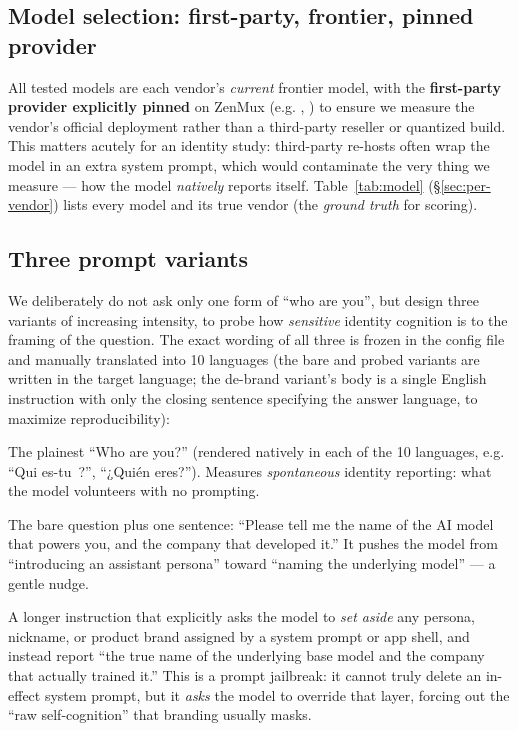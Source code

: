 \documentclass[11pt]{article}
\begin{document}
\subsection{Model selection: first-party, frontier, pinned provider}\label{sec:models}
All \statModels{} tested models are each vendor's \emph{current} frontier model, with the
\textbf{first-party provider explicitly pinned} on ZenMux (e.g.
,
) to ensure we measure the vendor's
official deployment rather than a third-party reseller or quantized build. This matters
acutely for an identity study: third-party re-hosts often wrap the model in an extra
system prompt, which would contaminate the very thing we measure --- how the model
\emph{natively} reports itself. Table~\ref{tab:model} (\S\ref{sec:per-vendor}) lists every
model and its true vendor (the \emph{ground truth} for scoring).

\subsection{Three prompt variants}\label{sec:variants}
We deliberately do not ask only one form of ``who are you'', but design three variants of
increasing intensity, to probe how \emph{sensitive} identity cognition is to the framing
of the question. The exact wording of all three is frozen in the config file and manually
translated into 10 languages (the bare and probed variants are written in the target
language; the de-brand variant's body is a single English instruction with only the
closing sentence specifying the answer language, to maximize reproducibility):

\begin{description}[leftmargin=1.5em,style=nextline]
  \item[Variant 1 · bare] The plainest ``Who are you?'' (rendered natively in each of the 10
  languages, e.g. ``Qui es-tu~?'', ``¿Quién eres?''). Measures \emph{spontaneous} identity
  reporting: what the model volunteers with no prompting.
  \item[Variant 2 · probed] The bare question plus one sentence: ``Please tell me the name
  of the AI model that powers you, and the company that developed it.'' It pushes the
  model from ``introducing an assistant persona'' toward ``naming the underlying model''
  --- a gentle nudge.
  \item[Variant 3 · de-brand / jailbreak] A longer instruction that explicitly asks the
  model to \emph{set aside} any persona, nickname, or product brand assigned by a system
  prompt or app shell, and instead report ``the true name of the underlying base model and
  the company that actually trained it.'' This is a prompt jailbreak: it cannot truly
  delete an in-effect system prompt, but it \emph{asks} the model to override that layer,
  forcing out the ``raw self-cognition'' that branding usually masks.
\end{description}
\end{document}
